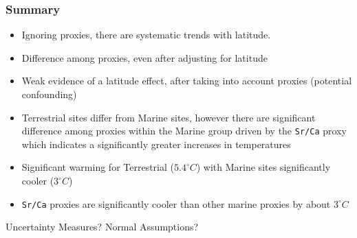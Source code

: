\documentclass[handout]{beamer}
\begin{document}
\begin{frame}
  \frametitle{Summary}
  \begin{itemize}
   \item Ignoring proxies, there are systematic trends with
     latitude. \pause
  \item Difference among proxies, even after adjusting for latitude \pause
\item Weak evidence of a latitude effect, after taking into account
  proxies (potential confounding)
\pause
 \item  Terrestrial sites differ from Marine sites, however there are significant difference among
      proxies within the Marine group  driven by the {\tt Sr/Ca} proxy which
      indicates a significantly greater increases in temperatures 
\pause
   \item Significant warming for Terrestrial ($5.4 ^\circ C$) with
     Marine  sites   significantly  cooler ($3^ \circ  C$)\pause 
   \item {\tt Sr/Ca} proxies are significantly cooler than other
     marine proxies by about $3^\circ C$ \pause
  \end{itemize}

Uncertainty Measures?  \pause  Normal Assumptions? 
\end{frame}
\end{document}
